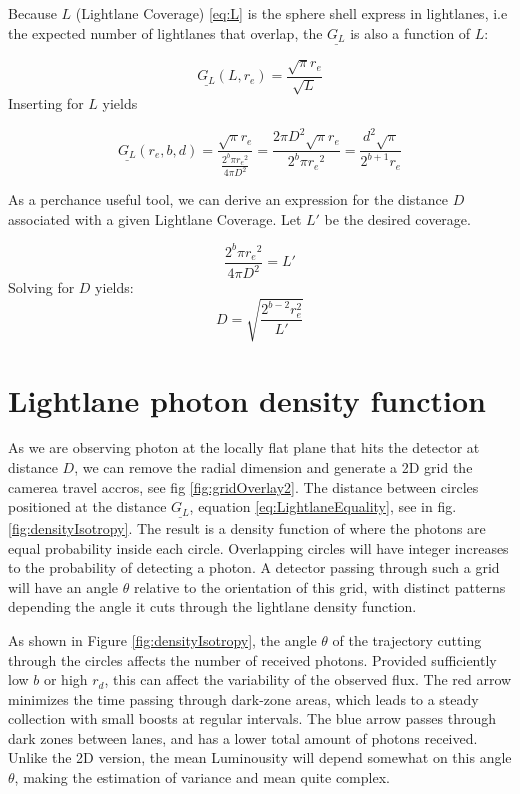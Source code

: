 \documentclass[notitlepage]{article}
\begin{document}
Because  $L$ (Lightlane Coverage) \eqref{eq:L} is the sphere shell express in lightlanes, i.e the expected number of lightlanes that overlap, the $\underline{G_L}$ is also a function of $L$:

\begin{equation}
\underline{G_L}(L, r_e) = \frac{\sqrt{\pi}r_e}{\sqrt{L}} 
\end{equation}
Inserting for $L$ yields

\begin{equation}
\underline{G_L}(r_e, b, d)
= 
\frac{\sqrt{\pi}r_e}{\frac{2^b \pi {r_e}^2 }{4\pi D^2}} 
=
\frac{2\pi D^2 \sqrt{\pi}r_e}{2^b \pi {r_e}^2 } 
= 
\frac{ d^2 \sqrt{\pi}}{2^{b+1}  r_e } 
\end{equation}

As a perchance useful tool, we can derive an expression for the distance $D$ associated with a given Lightlane Coverage. Let $L'$ be the desired coverage. 

\begin{equation}
\frac{2^b \pi {r_e}^2 }{4\pi D^2}  = L'
\end{equation}
Solving for $D$ yields:
\begin{equation}
D = \sqrt{\frac{2^{b-2}r_e^2}{L'}}
\label{eq:distance_to_star}
\end{equation}


\section{Lightlane photon density function }
As we are observing photon at the locally flat plane that hits the detector at distance $D$, we can remove the radial dimension and generate a 2D grid the camerea travel accros, see fig \ref{fig:gridOverlay2}. The distance between circles positioned at the distance $\underline{G_L}$, equation \eqref{eq:LightlaneEquality}, see in fig. \ref{fig:densityIsotropy}. The result is a density function of where the photons are equal probability inside each circle. Overlapping circles will have integer increases to the probability of detecting a photon. A detector passing through such a grid will have an angle $\theta$ relative to the orientation of this grid, with distinct patterns depending the angle it cuts through the lightlane density function. 

As shown in Figure \ref{fig:densityIsotropy}, the angle $\theta$ of the trajectory cutting through the circles affects the number of received photons. Provided sufficiently low $b$ or high $r_d$, this can affect the variability of the observed flux. The red arrow minimizes the time passing through dark-zone areas, which leads to a steady collection with small boosts at regular intervals. The blue arrow passes through dark zones between lanes, and has a lower total amount of photons received. Unlike the 2D version, the mean Luminousity will depend somewhat on this angle $\theta$, making the estimation of variance and mean quite complex.
\end{document}
